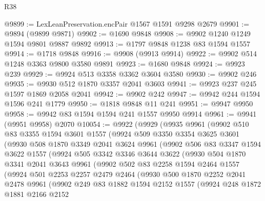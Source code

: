 \begin{lexlean}{R38}
\begin{coremodule}
@9899 := LexLeanPreservation.encPair @1567 @1591 @9298 @2679
@9901 := @9894 (@9899 @9871)
@9902 := @1690 @9848
@9908 := @9902 @1240 @1249 @1594 @9801 @9887 @9892
@9913 := @1797 @9848 @1238 @83 @1594 @1557
@9914 := @1718 @9848
@9916 := @9908 (@9913 @9914)
@9922 := @9902 @514 @1248 @3363 @9800 @3580 @9891
@9923 := @1680 @9848
@9924 := @9923 @239
@9929 := @9924 @513 @3358 @3362 @3604 @3580
@9930 := @9902 @246
@9935 := @9930 @512 @1870 @3357 @2041 @3603
@9941 := @9923 @237 @245 @1597 @1869 @2058 @2041
@9942 := @9902 @242
@9947 := @9942 @244 @1594 @1596 @241 @1779
@9950 := @1818 @9848 @11 @241
@9951 := @9947 @9950
@9958 := @9942 @83 @1594 @1594 @241 @1557 @9950 @9914
@9961 := @9941 (@9951 @9958) @2070
@10054 := @9922
    (@9929
      (@9935
        @9961
        (@9902
          @510
          @83
          @3355
          @1594
          @3601
          @1557
          (@9924
            @509
            @3350
            @3354
            @3625
            @3601
            (@9930
              @508
              @1870
              @3349
              @2041
              @3624
              @9961
              (@9902
                @506
                @83
                @3347
                @1594
                @3622
                @1557
                (@9924
                  @505
                  @3342
                  @3346
                  @3644
                  @3622
                  (@9930
                    @504
                    @1870
                    @3341
                    @2041
                    @3643
                    @9961
                    (@9902
                      @502
                      @83
                      @2258
                      @1594
                      @2464
                      @1557
                      (@9924
                        @501
                        @2253
                        @2257
                        @2479
                        @2464
                        (@9930
                          @500
                          @1870
                          @2252
                          @2041
                          @2478
                          @9961
                          (@9902
                            @249
                            @83
                            @1882
                            @1594
                            @2152
                            @1557
                            (@9924
                              @248
                              @1872
                              @1881
                              @2166
                              @2152

\end{coremodule}
\end{lexlean}
